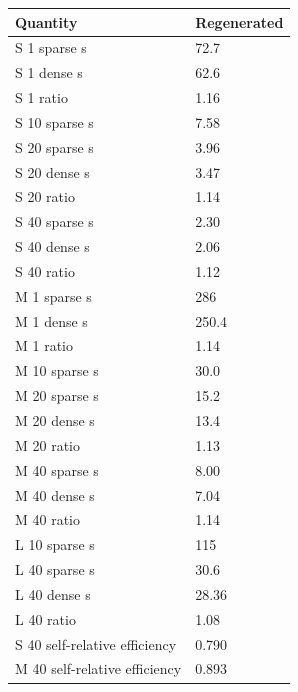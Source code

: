 \begin{tabular}{ll}
Quantity & Regenerated \\
\hline
S 1 sparse s & 72.7 \\
S 1 dense s & 62.6 \\
S 1 ratio & 1.16 \\
S 10 sparse s & 7.58 \\
S 20 sparse s & 3.96 \\
S 20 dense s & 3.47 \\
S 20 ratio & 1.14 \\
S 40 sparse s & 2.30 \\
S 40 dense s & 2.06 \\
S 40 ratio & 1.12 \\
M 1 sparse s & 286 \\
M 1 dense s & 250.4 \\
M 1 ratio & 1.14 \\
M 10 sparse s & 30.0 \\
M 20 sparse s & 15.2 \\
M 20 dense s & 13.4 \\
M 20 ratio & 1.13 \\
M 40 sparse s & 8.00 \\
M 40 dense s & 7.04 \\
M 40 ratio & 1.14 \\
L 10 sparse s & 115 \\
L 40 sparse s & 30.6 \\
L 40 dense s & 28.36 \\
L 40 ratio & 1.08 \\
S 40 self-relative efficiency & 0.790 \\
M 40 self-relative efficiency & 0.893 \\
\end{tabular}
